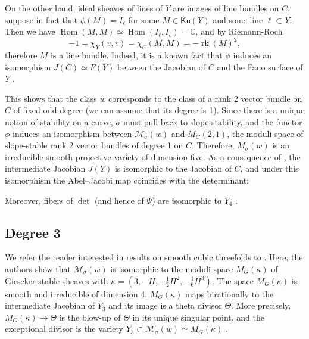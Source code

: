 \documentclass[11pt]{amsart}
\theoremstyle{definition}
\newcommand{\C}{\mathbb{C}}
\DeclareMathOperator{\rk}{rk}
\DeclareMathOperator{\Hom}{Hom}
\DeclareMathOperator{\Pic}{Pic\,}
\newcommand{\sM}{\mathcal{M}}
\newcommand{\AAA}[1]{\textcolor{red}{#1}}
\newcommand{\Ku}{\mathsf{Ku}}
\begin{document}
On the other hand, ideal sheaves of lines of $Y$ are images of line bundles on $C$: suppose in fact that $\phi(M)=I_\ell$ for some $M\in \Ku(Y)$ and some line $\ell\subset Y$. Then we have $\Hom(M,M)\simeq \Hom(I_\ell,I_\ell)=\C$, and by Riemann-Roch
\[ -1 = \chi_Y(v,v)=\chi_C(M,M)=-\rk(M)^2, \]
therefore $M$ is a line bundle. Indeed, it is a known fact that $\phi$ induces an isomorphism $J(C) \simeq F(Y)$ between the Jacobian of $C$ and the Fano surface of $Y$ \cite[Theorem~4.8]{Rei72}. 

This shows that the class $w$ corresponds to the class of a rank 2 vector bundle on $C$ of fixed odd degree (we can assume that its degree is 1). Since there is a unique notion of stability on a curve, $\sigma$ must pull-back to slope-stability, and the functor $\phi$ induces an isomorphism between $\sM_\sigma(w)$ and $M_C(2,1)$, the moduli space of slope-stable rank 2 vector bundles of degree 1 on $C$.  Therefore, $M_\sigma(w)$ is an irreducible smooth projective variety of dimension five. As a consequence of \cite[Theorem 4.14(c')]{Rei72}, the intermediate Jacobian $J(Y)$ is isomorphic to the Jacobian of $C$, and under this isomorphism the Abel--Jacobi map coincides with the determinant:
\begin{center}
\end{center}
Moreover, fibers of $\det$ (and hence of $\Psi$) are isomorphic to $Y_4$ \cite{new68}.




\subsection{Degree 3}\label{ssec_deg3}

We refer the reader interested in results on smooth cubic threefolds to \cite{Bayer}. Here, the authors show that 
$\sM_\sigma(w)$ is isomorphic to the moduli space $M_G(\kappa)$ of Gieseker-stable sheaves with $\kappa=\left(3,-H,-\frac 12 H^2, -\frac 16 H^3\right)$. The space $M_G(\kappa)$ is smooth and irreducible of dimension 4. $M_G(\kappa)$ maps birationally to the intermediate Jacobian of $Y_3$ and its image is a theta divisor $\Theta$. More precisely, $M_G(\kappa)\to \Theta$ is the blow-up of $\Theta$ in its unique singular point, and the exceptional divisor is the variety $Y_3\subset \sM_\sigma(w)\simeq M_G(\kappa)$ \cite[Theorem 7.1]{Bayer}. 
\end{document}
